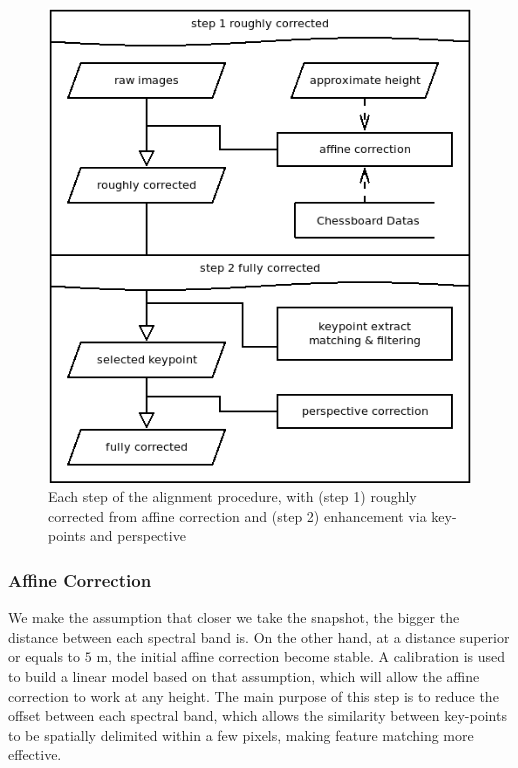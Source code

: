 \documentclass[a4paper,twoside]{article}
\begin{document}
	\begin{figure}[h]
		\centering
		\includegraphics[width=\linewidth]{../figures/step.png}
		\caption{Each step of the alignment procedure, with (step 1) roughly corrected from affine correction and (step 2) enhancement via key-points and perspective}
		\label{fig:each-stages}
	\end{figure}

	
	\subsubsection{Affine Correction}
	\label{sec:affine}
	
	We make the assumption that closer we take the snapshot, the bigger the distance between each spectral band is. %
	On the other hand, at a distance superior or equals to $5$ m, the initial affine correction become stable. %
	A calibration is used to build a linear model based on that assumption, which will allow the affine correction to work at any height.
	The main purpose of this step is to reduce the offset between each spectral band,
	which allows the similarity between key-points to be spatially delimited within a few pixels, making feature matching more effective.
	
\end{document}
